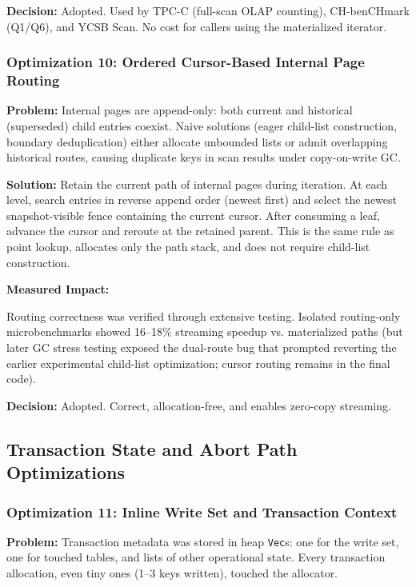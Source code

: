 \documentclass[11pt]{article}
\newcommand{\code}[1]{\texttt{#1}}
\begin{document}
\textbf{Decision:} Adopted. Used by TPC-C (full-scan OLAP counting), CH-benCHmark (Q1/Q6),
and YCSB Scan. No cost for callers using the materialized iterator.

\subsubsection{Optimization 10: Ordered Cursor-Based Internal Page Routing}

\textbf{Problem:}
Internal pages are append-only: both current and historical (superseded) child entries
coexist. Naive solutions (eager child-list construction, boundary deduplication)
either allocate unbounded lists or admit overlapping historical routes, causing
duplicate keys in scan results under copy-on-write GC.

\textbf{Solution:}
Retain the current path of internal pages during iteration. At each level, search
entries in reverse append order (newest first) and select the newest snapshot-visible
fence containing the current cursor. After consuming a leaf, advance the cursor and
reroute at the retained parent. This is the same rule as point lookup, allocates only
the path stack, and does not require child-list construction.

\textbf{Measured Impact:}

Routing correctness was verified through extensive testing. Isolated routing-only
microbenchmarks showed 16--18\% streaming speedup vs. materialized paths (but later
GC stress testing exposed the dual-route bug that prompted reverting the earlier
experimental child-list optimization; cursor routing remains in the final code).

\textbf{Decision:} Adopted. Correct, allocation-free, and enables zero-copy streaming.

\subsection{Transaction State and Abort Path Optimizations}
\label{sec:tx_optimizations}

\subsubsection{Optimization 11: Inline Write Set and Transaction Context}

\textbf{Problem:}
Transaction metadata was stored in heap \code{Vec}s: one for the write set, one for
touched tables, and lists of other operational state. Every transaction allocation,
even tiny ones (1--3 keys written), touched the allocator.
\end{document}
